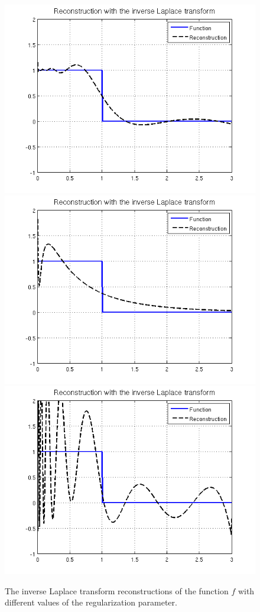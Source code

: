 \documentclass[12pt,a4]{article}
\begin{document}
\begin{figure}[h!]
\begin{center}
\includegraphics[scale=.5]{img/reconstruction.png}
\includegraphics[scale=.4]{img/reconstruction_large.png}
\includegraphics[scale=.4]{img/reconstruction_small.png}
\end{center}
\caption{The inverse Laplace transform reconstructions of the function $f$ with different values of the regularization parameter.}
\label{fig:reconstruction}
\end{figure}
\end{document}
